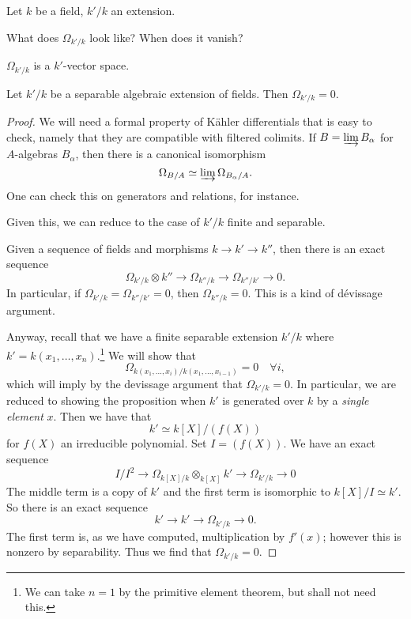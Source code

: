 \begin{example} 
Let $k$ be a field, $k'/k$ an extension. 
\begin{question} 
What does $\Omega_{k'/k}$ look like? When does it vanish?
\end{question} 
$\Omega_{k'/k}$ is a $k'$-vector space.

\begin{proposition} 
Let $k'/k$ be a separable algebraic extension of fields. Then $\Omega_{k'/k} = 0$.
\end{proposition} 
\begin{proof} 
We will need a formal property of K\"ahler differentials that is easy to check,
namely that they are compatible with filtered colimits. If $B = \varinjlim
B_\alpha$ for $A$-algebras $B_\alpha$, then there is a canonical isomorphism
\[ \Omega_{B/A} \simeq \varinjlim \Omega_{B_{\alpha}/A}.  \]
One can check this on generators and relations, for instance.

Given this, we can reduce to the case of $k'/k$ finite and separable. 
\begin{remark} 
Given a sequence of fields and morphisms $k \to k' \to k''$, then there is an
exact sequence
\[ \Omega_{k'/k} \otimes k'' \to \Omega_{k''/k} \to \Omega_{k''/k'} \to 0.  \]
In particular, if $\Omega_{k'/k} = \Omega_{k''/k'} =0 $, then $\Omega_{k''/k} =
0$. This is a kind of d\'evissage argument.
\end{remark} 

Anyway, recall that we have a finite separable extension $k'/k$ where $k' =
k(x_1, \dots, x_n)$.\footnote{We can take $n=1$ by the primitive element
theorem, but shall not need this.} We will show that
\[ \Omega_{k(x_1, \dots, x_i)/k(x_1, \dots, x_{i-1})} =0 \quad \forall i,  \]
which will imply by the devissage argument that $\Omega_{k'/k} = 0$.
In particular, we are reduced to showing the proposition when $k'$ is generated
over $k$ by a \emph{single element} $x$. Then we have that
\[ k' \simeq k[X]/(f(X))  \]
for $f(X)$ an irreducible polynomial. Set $I = (f(X))$. We have an exact sequence
\[ I/I^2 \to \Omega_{k[X]/k} \otimes_{k[X]} k' \to \Omega_{k'/k} \to 0 \]
The middle term is a copy of $k'$ and the first term is isomorphic to $k[X]/I
\simeq k'$. So there is an exact sequence
\[ k' \to k' \to \Omega_{k'/k} \to 0.  \]
The first term is, as we have computed, multiplication by $f'(x)$; however
this is nonzero by separability. Thus we find that $\Omega_{k'/k} =0$.
\end{proof} 
\end{example} 

